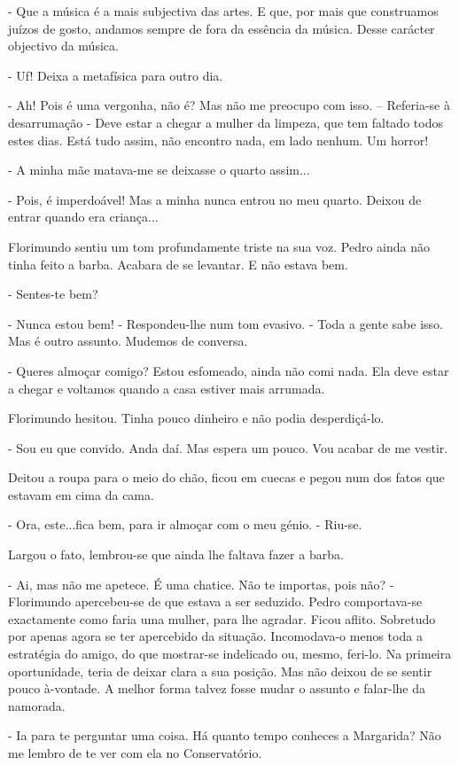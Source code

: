 - Que a música é a mais subjectiva das artes. E que, por mais que
construamos juízos de gosto, andamos sempre de fora da essência da
música. Desse carácter objectivo da música.

- Uf! Deixa a metafísica para outro dia.

- Ah! Pois é uma vergonha, não é? Mas não me preocupo com isso. --
Referia-se à desarrumação - Deve estar a chegar a mulher da limpeza, que
tem faltado todos estes dias. Está tudo assim, não encontro nada, em
lado nenhum. Um horror!

- A minha mãe matava-me se deixasse o quarto assim...

- Pois, é imperdoável! Mas a minha nunca entrou no meu quarto. Deixou de
entrar quando era criança...

Florimundo sentiu um tom profundamente triste na sua voz. Pedro ainda
não tinha feito a barba. Acabara de se levantar. E não estava bem.

- Sentes-te bem?

- Nunca estou bem! - Respondeu-lhe num tom evasivo. - Toda a gente sabe
isso. Mas é outro assunto. Mudemos de conversa.

- Queres almoçar comigo? Estou esfomeado, ainda não comi nada. Ela deve
estar a chegar e voltamos quando a casa estiver mais arrumada.

Florimundo hesitou. Tinha pouco dinheiro e não podia desperdiçá-lo.

- Sou eu que convido. Anda daí. Mas espera um pouco. Vou acabar de me
vestir.

Deitou a roupa para o meio do chão, ficou em cuecas e pegou num dos
fatos que estavam em cima da cama.

- Ora, este...fica bem, para ir almoçar com o meu génio. - Riu-se.

Largou o fato, lembrou-se que ainda lhe faltava fazer a barba.

- Ai, mas não me apetece. É uma chatice. Não te importas, pois não? -
Florimundo apercebeu-se de que estava a ser seduzido. Pedro
comportava-se exactamente como faria uma mulher, para lhe agradar. Ficou
aflito. Sobretudo por apenas agora se ter apercebido da situação.
Incomodava-o menos toda a estratégia do amigo, do que mostrar-se
indelicado ou, mesmo, feri-lo. Na primeira oportunidade, teria de deixar
clara a sua posição. Mas não deixou de se sentir pouco à-vontade. A
melhor forma talvez fosse mudar o assunto e falar-lhe da namorada.

- Ia para te perguntar uma coisa. Há quanto tempo conheces a Margarida?
Não me lembro de te ver com ela no Conservatório.

